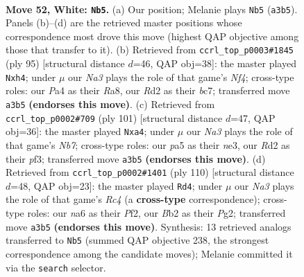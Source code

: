 \documentclass[11pt]{article}
\begin{document}
\clearpage

\begin{figure}[p]\centering
\begin{subfigure}{0.46\textwidth}\centering
\resizebox{\linewidth}{!}{%
\newchessgame
\chessboard[
  setfen={8/1p2p1k1/n1r3pp/p7/P1p2K2/N1P2P2/1B1R4/8 w - - 9 52},
  showmover=false,
  pgfstyle=straightmove, color=movearrow, markmove={a3-b5}
]}
\caption{}
\end{subfigure}\hfill
\begin{subfigure}{0.46\textwidth}\centering
\resizebox{\linewidth}{!}{%
\newchessgame
\chessboard[
  setfen={r7/2B5/5pk1/1KNp1n1b/3P1P1P/p7/P2R4/8 b - - 0 48},
  showmover=false,
  pgfstyle=straightmove, color=movearrow, markmove={f5-h4}
]}
\caption{}
\end{subfigure}
\\[4pt]
\begin{subfigure}{0.46\textwidth}\centering
\resizebox{\linewidth}{!}{%
\newchessgame
\chessboard[
  setfen={8/4kp2/p3p3/2p1P3/P3R3/4NP2/rn4PP/5K2 b - - 4 51},
  showmover=false,
  pgfstyle=straightmove, color=movearrow, markmove={b2-a4}
]}
\caption{}
\end{subfigure}\hfill
\begin{subfigure}{0.46\textwidth}\centering
\resizebox{\linewidth}{!}{%
\newchessgame
\chessboard[
  setfen={8/5p1k/1p2r2p/6p1/P1R1p1P1/4P3/5PPK/8 w - - 15 56},
  showmover=false,
  pgfstyle=straightmove, color=movearrow, markmove={c4-d4}
]}
\caption{}
\end{subfigure}
\caption{\textbf{Move 52, White: \texttt{Nb5}.} (a) Our position; Melanie plays \texttt{Nb5} (\texttt{a3b5}). Panels (b)--(d) are the retrieved master positions whose correspondence most drove this move (highest QAP objective among those that transfer to it). (b) Retrieved from \texttt{ccrl\_top\_p0003\#1845} (ply 95) [structural distance $d$=46, QAP obj=38]: the master played \texttt{Nxh4}; under $\mu$ our \emph{Na3} plays the role of that game's \emph{Nf4}; cross-type roles: our \emph{P}a4 as their \emph{R}a8, our \emph{R}d2 as their \emph{b}c7; transferred move \texttt{a3b5} \textbf{(endorses this move)}. (c) Retrieved from \texttt{ccrl\_top\_p0002\#709} (ply 101) [structural distance $d$=47, QAP obj=36]: the master played \texttt{Nxa4}; under $\mu$ our \emph{Na3} plays the role of that game's \emph{Nb7}; cross-type roles: our \emph{p}a5 as their \emph{n}e3, our \emph{R}d2 as their \emph{p}f3; transferred move \texttt{a3b5} \textbf{(endorses this move)}. (d) Retrieved from \texttt{ccrl\_top\_p0002\#1401} (ply 110) [structural distance $d$=48, QAP obj=23]: the master played \texttt{Rd4}; under $\mu$ our \emph{Na3} plays the role of that game's \emph{Rc4} (a \textbf{cross-type} correspondence); cross-type roles: our \emph{n}a6 as their \emph{P}f2, our \emph{B}b2 as their \emph{P}g2; transferred move \texttt{a3b5} \textbf{(endorses this move)}. Synthesis: 13 retrieved analogs transferred to \texttt{Nb5} (summed QAP objective 238, the strongest correspondence among the candidate moves); Melanie committed it via the \texttt{search} selector.}
\label{fig:thought-m102}
\end{figure}
\end{document}
